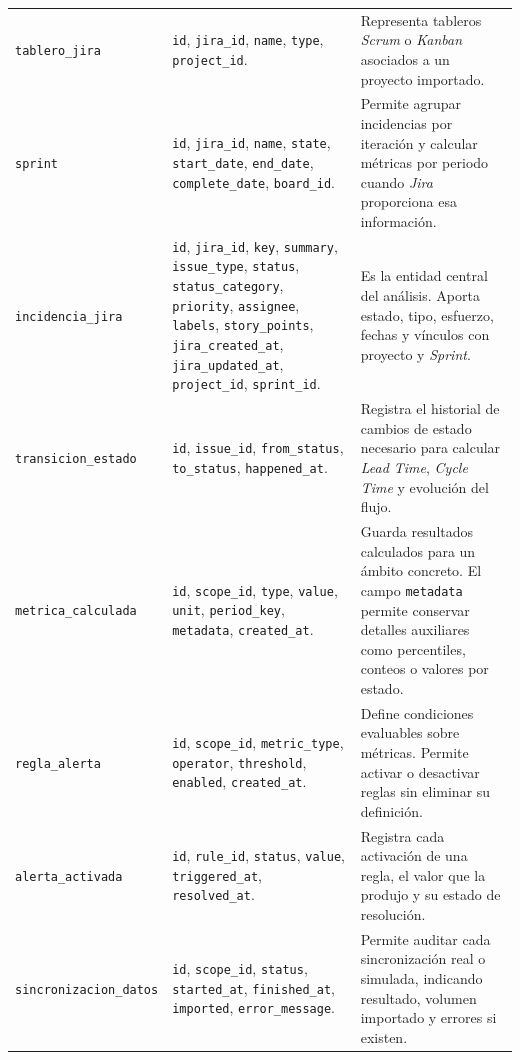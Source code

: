 \begin{landscape}
{\begin{longtable}{>{\raggedright\arraybackslash}p{5.2cm}>{\raggedright\arraybackslash}p{12.0cm}>{\raggedright\arraybackslash}p{6.0cm}}
\texttt{tablero\_jira} & \texttt{id}, \texttt{jira\_id}, \texttt{name}, \texttt{type}, \texttt{project\_id}. & Representa tableros \textit{Scrum} o \textit{Kanban} asociados a un proyecto importado. \\
\texttt{sprint} & \texttt{id}, \texttt{jira\_id}, \texttt{name}, \texttt{state}, \texttt{start\_date}, \texttt{end\_date}, \texttt{complete\_date}, \texttt{board\_id}. & Permite agrupar incidencias por iteración y calcular métricas por periodo cuando \textit{Jira} proporciona esa información. \\
\texttt{incidencia\_jira} & \texttt{id}, \texttt{jira\_id}, \texttt{key}, \texttt{summary}, \texttt{issue\_type}, \texttt{status}, \texttt{status\_category}, \texttt{priority}, \texttt{assignee}, \texttt{labels}, \texttt{story\_points}, \texttt{jira\_created\_at}, \texttt{jira\_updated\_at}, \texttt{project\_id}, \texttt{sprint\_id}. & Es la entidad central del análisis. Aporta estado, tipo, esfuerzo, fechas y vínculos con proyecto y \textit{Sprint}. \\
\texttt{transicion\_estado} & \texttt{id}, \texttt{issue\_id}, \texttt{from\_status}, \texttt{to\_status}, \texttt{happened\_at}. & Registra el historial de cambios de estado necesario para calcular \textit{Lead Time}, \textit{Cycle Time} y evolución del flujo. \\
\texttt{metrica\_calculada} & \texttt{id}, \texttt{scope\_id}, \texttt{type}, \texttt{value}, \texttt{unit}, \texttt{period\_key}, \texttt{metadata}, \texttt{created\_at}. & Guarda resultados calculados para un ámbito concreto. El campo \texttt{metadata} permite conservar detalles auxiliares como percentiles, conteos o valores por estado. \\
\texttt{regla\_alerta} & \texttt{id}, \texttt{scope\_id}, \texttt{metric\_type}, \texttt{operator}, \texttt{threshold}, \texttt{enabled}, \texttt{created\_at}. & Define condiciones evaluables sobre métricas. Permite activar o desactivar reglas sin eliminar su definición. \\
\texttt{alerta\_activada} & \texttt{id}, \texttt{rule\_id}, \texttt{status}, \texttt{value}, \texttt{triggered\_at}, \texttt{resolved\_at}. & Registra cada activación de una regla, el valor que la produjo y su estado de resolución. \\
\texttt{sincronizacion\_datos} & \texttt{id}, \texttt{scope\_id}, \texttt{status}, \texttt{started\_at}, \texttt{finished\_at}, \texttt{imported}, \texttt{error\_message}. & Permite auditar cada sincronización real o simulada, indicando resultado, volumen importado y errores si existen. \\

\end{longtable}}
\end{landscape}
